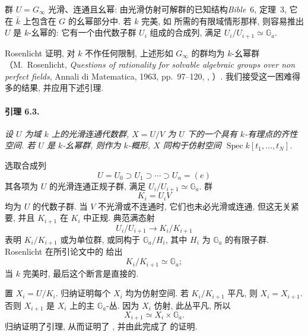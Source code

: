 群 \(U=G_\infty\) 光滑、连通且幺幂: 由光滑仿射可解群的已知结构\textup{\emph{Bible}~6, 定理~3}, 它在 \(\bar k\) 上包含在 \(G\) 的幺幂部分中. 若 \(k\) 完美, 如  所需的有限域情形那样, 则容易推出 \(U\) 是 \(k\)-幺幂的: 它有一个由代数子群 \(U_i\) 组成的合成列, 满足 \(U_i/U_{i+1}\simeq\mathbb G_a\).

Rosenlicht 证明, 对 \(k\) 不作任何限制, 上述形如 \(G_\infty\) 的群均为 \(k\)-幺幂群\textup{（M.~Rosenlicht, \emph{Questions of rationality for solvable algebraic groups over non perfect fields}, Annali di Matematica, 1963, pp.~97--120, , ）}. 我们接受这一困难得多的结果, 并应用下述引理.

\paragraph{\textbf{引理 6.3.}}
{\itshape 设 \(U\) 为域 \(k\) 上的光滑连通代数群, \(X=U/V\) 为 \(U\) 下的一个具有 \(k\)-有理点的齐性空间. 若 \(U\) 是 \(k\)-幺幂群, 则作为 \(k\)-概形, \(X\) 同构于仿射空间 \(\operatorname{Spec}k[t_1,\ldots,t_N]\).}

选取合成列
\[
  U=U_0\supset U_1\supset\cdots\supset U_n=(e)
\]
其各项为 \(U\) 的光滑连通正规子群, 满足 \(U_i/U_{i+1}\simeq\mathbb G_a\). 群
\[
  K_i=U_iV
\]
均为 \(U\) 的代数子群. 当 \(V\) 不光滑或不连通时, 它们也未必光滑或连通, 但这无关紧要, 并且 \(K_{i+1}\) 在 \(K_i\) 中正规. 典范满态射
\[
  U_i/U_{i+1}\longrightarrow K_i/K_{i+1}
\]
表明 \(K_i/K_{i+1}\) 或为单位群, 或同构于 \(\mathbb G_a/H_i\), 其中 \(H_i\) 为 \(\mathbb G_a\) 的有限子群. Rosenlicht 在所引论文中的 给出
\[
  K_i/K_{i+1}\simeq\mathbb G_a;
\]
当 \(k\) 完美时, 最后这个断言是直接的.

置 \(X_i=U/K_i\). 归纳证明每个 \(X_i\) 均为仿射空间. 若 \(K_i/K_{i+1}\) 平凡, 则 \(X_i=X_{i+1}\). 否则 \(X_{i+1}\) 是 \(X_i\) 上的主 \(\mathbb G_a\)-丛. 因为 \(X_i\) 仿射, 此丛平凡, 所以
\[
  X_{i+1}\simeq X_i\times\mathbb G_a.
\]
归纳证明了引理, 从而证明了 , 并由此完成了  的证明.



